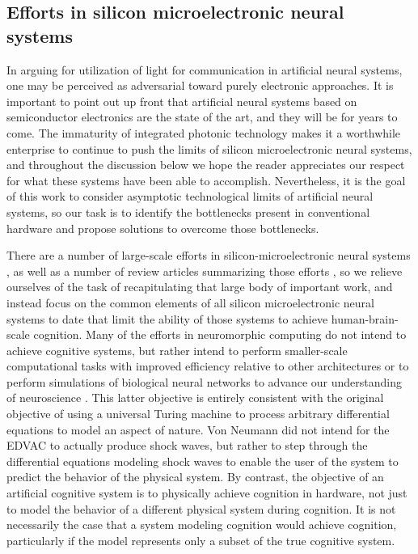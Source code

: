 \documentclass[twocolumn]{article}
\begin{document}
\subsection{Efforts in silicon microelectronic neural systems}
In arguing for utilization of light for communication in artificial neural systems, one may be perceived as adversarial toward purely electronic approaches. It is important to point out up front that artificial neural systems based on semiconductor electronics are the state of the art, and they will be for years to come. The immaturity of integrated photonic technology makes it a worthwhile enterprise to continue to push the limits of silicon microelectronic neural systems, and throughout the discussion below we hope the reader appreciates our respect for what these systems have been able to accomplish. Nevertheless, it is the goal of this work to consider asymptotic technological limits of artificial neural systems, so our task is to identify the bottlenecks present in conventional hardware and propose solutions to overcome those bottlenecks.

There are a number of large-scale efforts in silicon-microelectronic neural systems \cite{}, as well as a number of review articles summarizing those efforts \cite{}, so we relieve ourselves of the task of recapitulating that large body of important work, and instead focus on the common elements of all silicon microelectronic neural systems to date that limit the ability of those systems to achieve human-brain-scale cognition. Many of the efforts in neuromorphic computing do not intend to achieve cognitive systems, but rather intend to perform smaller-scale computational tasks with improved efficiency relative to other architectures \cite{mear2014,dasr2018} or to perform simulations of biological neural networks to advance our understanding of neuroscience \cite{pfgr2013,fuga2014}. This latter objective is entirely consistent with the original objective of using a universal Turing machine to process arbitrary differential equations to model an aspect of nature. Von Neumann did not intend for the EDVAC to actually produce shock waves, but rather to step through the differential equations modeling shock waves to enable the user of the system to predict the behavior of the physical system. By contrast, the objective of an artificial cognitive system is to physically achieve cognition in hardware, not just to model the behavior of a different physical system during cognition. It is not necessarily the case that a system modeling cognition would achieve cognition, particularly if the model represents only a subset of the true cognitive system.
\end{document}

